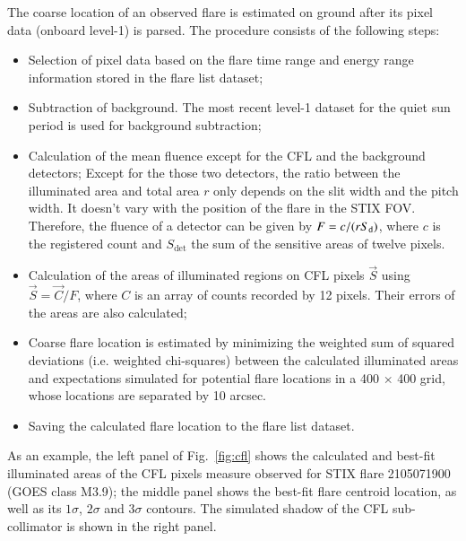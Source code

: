 \documentclass{aa}
\begin{document}
The coarse location of an observed flare is estimated on ground after its pixel data (onboard level-1) is parsed.
The procedure consists of the following steps:
\begin{itemize}
  \item Selection of pixel data based on the flare time range and energy range information stored in the flare list dataset;
  \item Subtraction of background. The most recent level-1 dataset for the quiet sun period is used for background subtraction;
  \item Calculation of the mean fluence except for the CFL and the background detectors; 
      Except for the those two detectors, the ratio between the illuminated area and total area $r$ only depends on the 
      slit width and the pitch width. It doesn't vary with the position of the flare in the STIX FOV.  
      Therefore, the fluence of a detector can be given by $F=c/(r S_{\rm d})$,  where $c$ is the registered 
      count and $S_\textrm{det}$ the sum of the sensitive areas of twelve pixels. 
  \item Calculation of the areas of illuminated regions on CFL pixels $\vec{S}$ using $\vec{S} = \vec{C}/F$, where $C$  is an array of counts 
  recorded by 12 pixels. Their errors of the areas are also calculated; 
  \item  Coarse flare location is estimated by minimizing the weighted sum of squared deviations 
  (i.e. weighted chi-squares) between  the calculated illuminated areas and  expectations
  simulated for potential flare locations in a 400 $\times$ 400 grid, whose locations are separated by 10 arcsec.  
  \item Saving the calculated flare location to the flare list dataset. 
\end{itemize}
As an example, the left panel of Fig.~\ref{fig:cfl} shows the calculated and best-fit illuminated areas 
of the CFL pixels measure observed for STIX flare 2105071900 (GOES class M3.9);   the middle panel shows the best-fit 
flare centroid location, as well as its $1\sigma$, $2\sigma$ and $3\sigma$ contours. 
The simulated shadow of the CFL sub-collimator  is shown in the right panel. 
\end{document}
